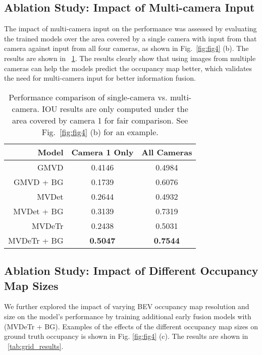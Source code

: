 \subsection{Ablation Study: Impact of Multi-camera Input}

The impact of multi-camera input on the performance was assessed by evaluating the trained models over the area covered by a single camera with input from that camera against input from all four cameras, as shown in Fig.~\ref{fig:fig4} (b). The results are shown in \tableautorefname~\ref{tab:view_results}. The results clearly show that using images from multiple cameras can help the models predict the occupancy map better, which validates the need for multi-camera input for better information fusion.

\begin{table}[h]
\centering
\begin{tabular}{rcc} \hline
\textbf{Model}  & \textbf{Camera 1 Only }   & \textbf{All Cameras} \\ \hline
GMVD        & 0.4146                       & 0.4984         \\ 
GMVD + BG   & 0.1739                       & 0.6076         \\ 
MVDet       & 0.2644                        & 0.4932          \\
MVDet + BG  & 0.3139                       & 0.7319          \\
MVDeTr      & 0.2438                      & 0.5031          \\
MVDeTr + BG & \textbf{0.5047}             & \textbf{0.7544}          \\
\hline
\end{tabular}
\caption{Performance comparison of single-camera vs. multi-camera. IOU results are only computed under the area covered by camera 1 for fair comparison. See Fig.~\ref{fig:fig4} (b) for an example.}
\label{tab:view_results}
\vspace{-0.1in}
\end{table}


\subsection{Ablation Study: Impact of Different Occupancy Map Sizes}

We further explored the impact of varying BEV occupancy map resolution and size on the model's performance by training additional early fusion models with (MVDeTr + BG). Examples of the effects of the different occupancy map sizes on ground truth occupancy is shown in Fig. \ref{fig:fig4} (c). The results are shown in \tableautorefname~\ref{tab:grid_results}.

